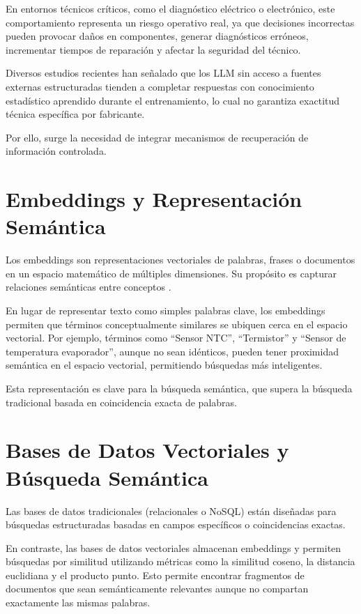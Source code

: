 {{En entornos técnicos críticos, como el diagnóstico eléctrico o electrónico, este comportamiento representa un riesgo operativo real, ya que decisiones incorrectas pueden provocar daños en componentes, generar diagnósticos erróneos, incrementar tiempos de reparación y afectar la seguridad del técnico.

Diversos estudios recientes \parencite{ji2023survey, lewis2020retrieval} han señalado que los LLM sin acceso a fuentes externas estructuradas tienden a completar respuestas con conocimiento estadístico aprendido durante el entrenamiento, lo cual no garantiza exactitud técnica específica por fabricante.

Por ello, surge la necesidad de integrar mecanismos de recuperación de información controlada.

\section{Embeddings y Representación Semántica}

Los embeddings son representaciones vectoriales de palabras, frases o documentos en un espacio matemático de múltiples dimensiones. Su propósito es capturar relaciones semánticas entre conceptos \parencite{mikolov2013efficient}.

En lugar de representar texto como simples palabras clave, los embeddings permiten que términos conceptualmente similares se ubiquen cerca en el espacio vectorial. Por ejemplo, términos como ``Sensor NTC'', ``Termistor'' y ``Sensor de temperatura evaporador'', aunque no sean idénticos, pueden tener proximidad semántica en el espacio vectorial, permitiendo búsquedas más inteligentes.

Esta representación es clave para la búsqueda semántica, que supera la búsqueda tradicional basada en coincidencia exacta de palabras.

\section{Bases de Datos Vectoriales y Búsqueda Semántica}

Las bases de datos tradicionales (relacionales o NoSQL) están diseñadas para búsquedas estructuradas basadas en campos específicos o coincidencias exactas.

En contraste, las bases de datos vectoriales almacenan embeddings y permiten búsquedas por similitud utilizando métricas como la similitud coseno, la distancia euclidiana y el producto punto. Esto permite encontrar fragmentos de documentos que sean semánticamente relevantes aunque no compartan exactamente las mismas palabras.

}}
